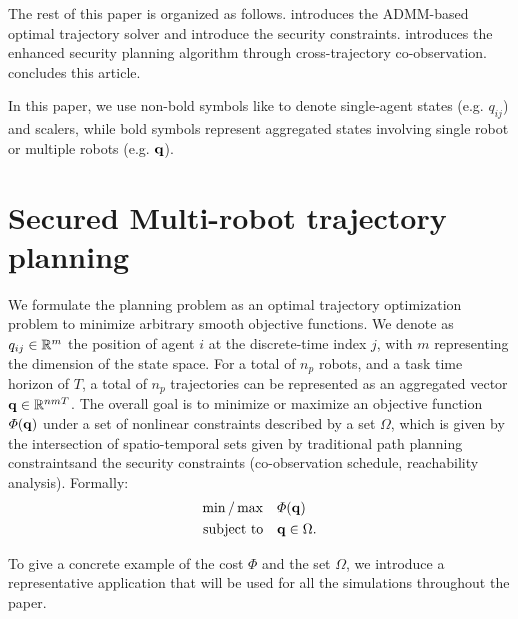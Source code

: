 \documentclass[10pt,twocolumn,twoside]{IEEEtran}
\begin{document}
The rest of this paper is organized as follows.  introduces the ADMM-based optimal trajectory solver and introduce the security constraints.  introduces the enhanced security planning algorithm through cross-trajectory co-observation.  concludes this article.

\noindent{} 
In this paper, we use non-bold symbols like to denote single-agent states (e.g. $q_{ij}$) and scalers, while bold symbols represent aggregated states involving single robot or multiple robots (e.g. $\mathbf{q}$). 

\section{Secured Multi-robot trajectory planning}\label{sec:ADMM-planning}
We formulate the planning problem as an optimal trajectory optimization problem to minimize arbitrary smooth objective functions. We denote as $q_{ij}\in\mathbb{R}^{m}{}$ the position of agent $i$ at the discrete-time index $j$, with $m$ representing the dimension of the state space. For a total of $n_p$ robots, and a task time horizon of $T$, a total of $n_p$ trajectories can be represented as an aggregated vector $\mathbf{q}\in \mathbb{R}^{n m T}{}$. 
The overall goal is to minimize or maximize an objective function $\varPhi(\mathbf{q})$ under a set of nonlinear constraints described by a set $\Omega$, which is given by the intersection of spatio-temporal sets given by traditional path planning constraintsand the security constraints (co-observation schedule, reachability analysis). Formally:
\begin{equation}\label{eq:general-problem}
	\begin{split}
		\min/\max & \quad \varPhi(\mathbf{q})\\
		\textrm{subject to} &\quad \mathbf{q} \in \Omega.
	\end{split}
\end{equation}

To give a concrete example of the cost $\varPhi$ and the set $\Omega$, we introduce a representative application that will be used for all the simulations throughout the paper.
\end{document}
